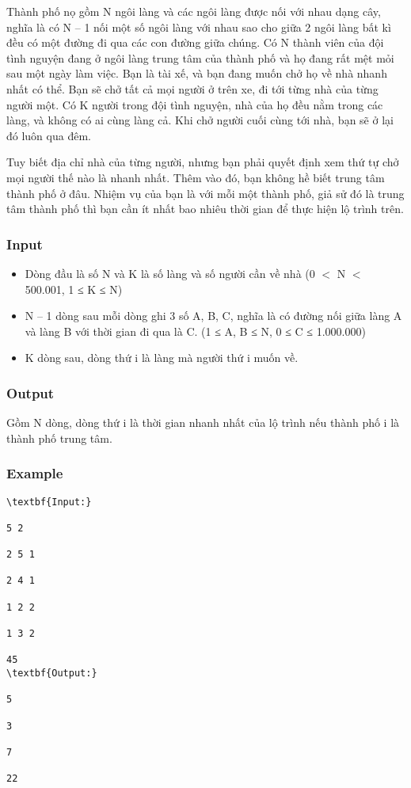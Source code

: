 



   Thành phố nọ gồm N ngôi làng và các ngôi làng được nối với nhau dạng cây, nghĩa là có N – 1 nối một số ngôi làng với nhau sao cho giữa 2 ngôi làng bất kì đều có một đường đi qua các con đường giữa chúng. Có N thành viên của đội tình nguyện đang ở ngôi làng trung tâm của thành phố và họ đang rất mệt mỏi sau một ngày làm việc. Bạn là tài xế, và bạn đang muốn chở họ về nhà nhanh nhất có thể. Bạn sẽ chở tất cả mọi người ở trên xe, đi tới từng nhà của từng người một. Có K người trong đội tình nguyện, nhà của họ đều nằm trong các làng, và không có ai cùng làng cả. Khi chở người cuối cùng tới nhà, bạn sẽ ở lại đó luôn qua đêm.  

   Tuy biết địa chỉ nhà của từng người, nhưng bạn phải quyết định xem thứ tự chở mọi người thế nào là nhanh nhất. Thêm vào đó, bạn không hề biết trung tâm thành phố ở đâu. Nhiệm vụ của bạn là với mỗi một thành phố, giả sử đó là trung tâm thành phố thì bạn cần ít nhất bao nhiêu thời gian để thực hiện lộ trình trên.  

\subsubsection{   Input  }
\begin{itemize}
	\item     Dòng đầu là số N và K là số làng và số người cần về nhà (0 $<$ N $<$ 500.001, 1 ≤ K ≤ N)   
	\item     N – 1 dòng sau mỗi dòng ghi 3 số A, B, C, nghĩa là có đường nối giữa làng A và làng B với thời gian đi qua là C. (1 ≤ A, B ≤ N, 0 ≤ C ≤ 1.000.000)   
	\item     K dòng sau, dòng thứ i là làng mà người thứ i muốn về.   
\end{itemize}

\subsubsection{   Output  }

   Gồm N dòng, dòng thứ i là thời gian nhanh nhất của lộ trình nếu thành phố i là thành phố trung tâm.  

\subsubsection{   Example  }
\begin{verbatim}
\textbf{Input:}

5 2

2 5 1

2 4 1

1 2 2

1 3 2

45
\textbf{Output:}

5

3

7

22\end{verbatim}